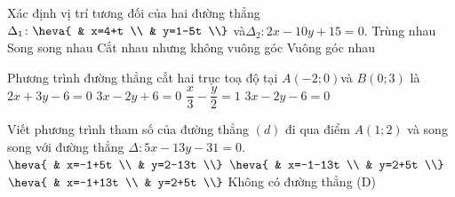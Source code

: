 \begin{ex}%
	Xác định vị trí tương đối của hai đường thẳng ${\Delta}_1\colon\heva{
		& x=4+t \\ 
		& y=1-5t \\}$ và\break ${\Delta}_2\colon 2x-10y+15=0$.
	\choice
	{Trùng nhau}
	{Song song nhau}
	{Cắt nhau nhưng không vuông góc}
	{\True Vuông góc nhau}
\end{ex}
\begin{ex}%
	Phương trình đường thẳng cắt hai trục toạ độ tại $A(-2;0)$và $B(0;3)$ là
	\choice
	{$2x+3y-6=0$}
	{\True $3x-2y+6=0$}
	{$\dfrac{x}{3}-\dfrac{y}{2}=1$}
	{$3x-2y-6=0$}
\end{ex}
\begin{ex}%
	Viết phương trình tham số của đường thẳng $(d)$ đi qua điểm $A(1;2)$ và song song với đường thẳng $\Delta\colon 5x-13y-31=0$.
	\choice
	{$\heva{
			& x=-1+5t \\ 
			& y=2-13t \\}$}
	{$\heva{
			& x=-1-13t \\ 
			& y=2+5t \\}$}
	{\True $\heva{
			& x=-1+13t \\ 
			& y=2+5t \\}$}
	{Không có đường thẳng (D)}
\end{ex}

